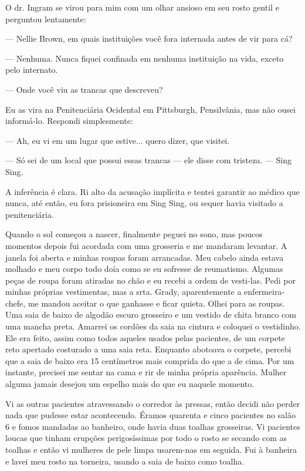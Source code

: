 O dr. Ingram se virou para mim com um olhar ansioso em seu rosto gentil
e perguntou lentamente:

--- Nellie Brown, em quais instituições você fora internada antes de vir
para cá?

--- Nenhuma. Nunca fiquei confinada em nenhuma instituição na vida,
exceto pelo internato.

--- Onde você viu as trancas que descreveu?

Eu as vira na Penitenciária Ocidental em Pittsburgh, Pensilvânia, mas
não ousei informá-lo. Respondi simplesmente:

--- Ah, eu vi em um lugar que estive... quero dizer, que visitei.

--- Só sei de um local que possui essas trancas --- ele disse com
tristeza. --- Sing Sing.

A inferência é clara. Ri alto da acusação implícita e tentei garantir ao
médico que nunca, até então, eu fora prisioneira em Sing Sing, ou sequer
havia visitado a penitenciária.

Quando o sol começou a nascer, finalmente peguei no sono, mas poucos
momentos depois fui acordada com uma grosseria e me mandaram levantar. A
janela foi aberta e minhas roupas foram arrancadas. Meu cabelo ainda
estava molhado e meu corpo todo doía como se eu sofresse de reumatismo.
Algumas peças de roupa foram atiradas no chão e eu recebi a ordem de
vesti-las. Pedi por minhas próprias vestimentas, mas a srta. Grady, aparentemente a
enfermeira-chefe, me mandou aceitar o que ganhasse e ficar quieta. Olhei
para as roupas. Uma saia de baixo de algodão escuro grosseiro e um
vestido de chita branco com uma mancha preta. Amarrei os cordões da saia
na cintura e coloquei o vestidinho. Ele era feito, assim como todos
aqueles usados pelas pacientes, de um corpete reto apertado costurado a
uma saia reta. Enquanto abotoava o corpete, percebi que a saia de baixo
era 15 centímetros mais comprida do que a de cima. Por um instante,
precisei me sentar na cama e rir de minha própria aparência. Mulher
alguma jamais desejou um espelho mais do que eu naquele momento.

Vi as outras pacientes atravessando o corredor às pressas, então decidi
não perder nada que pudesse estar acontecendo. Éramos quarenta e cinco
pacientes no salão 6 e fomos mandadas ao banheiro, onde havia duas
toalhas grosseiras. Vi pacientes loucas que tinham erupções
perigosíssimas por todo o rosto se secando com as toalhas e então vi
mulheres de pele limpa usarem-nas em seguida. Fui à banheira e lavei meu
rosto na torneira, usando a saia de baixo como toalha.

